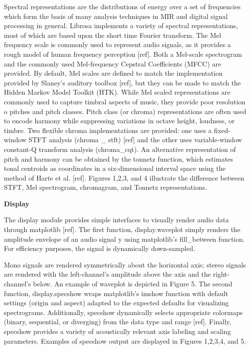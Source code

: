 Spectral representations are the distributions of energy over a set of frequencies which form the basis of many analysis techniques in MIR and digital signal processing in general. Librosa implements a variety of spectral representations, most of which are based upon the short \space time Fourier transform. The Mel frequency scale is commonly used to represent audio signals, as it provides a rough model of human frequency perception [ref]. Both a Mel-scale spectrogram and the commonly used Mel-frequency Cepstral Coefficients (MFCC) are provided. By default, Mel scales are defined to match the implementation provided by Slaney’s auditory toolbox [ref], but they can be made to match the Hidden Markov Model Toolkit (HTK). While Mel \space scaled representations are commonly used to capture timbral aspects of music, they provide poor resolution o pitches and pitch classes. Pitch class (or chroma) representations are often used to encode harmony while suppressing variations in octave height, loudness, or timbre. Two flexible chroma implementations are provided: one uses a fixed-window STFT analysis (chroma \_ stft) [ref] and the other uses variable-window constant-Q transform analysis (chroma\_cqt). An alternative representation of pitch and harmony can be obtained by the tonnetz function, which estimates tonal centroids as coordinates in a six-dimensional interval space using the method of Harte et \space al. [ref]. Figures 1,2,3, and 4 illustrate the difference between STFT, Mel spectrogram, chromagram, and Tonnetz representations.

\begin{flushleft}
  \textbf{Display}
\end{flushleft}

The display module provides simple interfaces to visually render audio data through matplotlib [ref]. The first function, display.waveplot simply renders the amplitude envelope of an audio signal y using matplotlib’s fill\_between function. For efficiency purposes, the signal is dynamically down-sampled.
\par
Mono signals are rendered symmetrically about the horizontal axis; stereo signals are rendered with the left-channel’s amplitude above the axis and the right-channel’s below. An example of waveplot is depicted in Figure 5. The second function, display.specshow wraps matplotlib’s imshow function with default settings (origin and aspect) adapted to the expected defaults for visualizing spectrograms. Additionally, specshow dynamically selects appropriate colormaps (binary, sequential, or diverging) from the data type and range [ref]. Finally, specshow provides a variety of acoustically relevant axis labeling and scaling parameters. Examples of specshow output are displayed in Figures 1,2,3,4, and 5.

